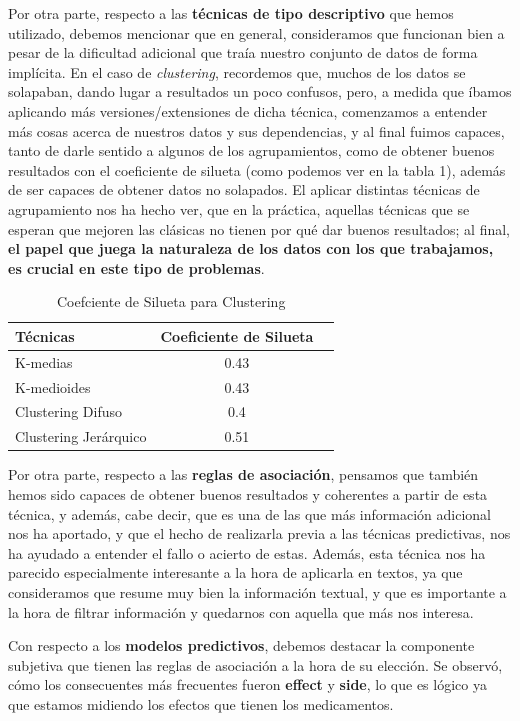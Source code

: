 \documentclass[spanish,]{article}
\begin{document}
Por otra parte, respecto a las \textbf{técnicas de tipo descriptivo} que
hemos utilizado, debemos mencionar que en general, consideramos que
funcionan bien a pesar de la dificultad adicional que traía nuestro
conjunto de datos de forma implícita. En el caso de \emph{clustering},
recordemos que, muchos de los datos se solapaban, dando lugar a
resultados un poco confusos, pero, a medida que íbamos aplicando más
versiones/extensiones de dicha técnica, comenzamos a entender más cosas
acerca de nuestros datos y sus dependencias, y al final fuimos capaces,
tanto de darle sentido a algunos de los agrupamientos, como de obtener
buenos resultados con el coeficiente de silueta (como podemos ver en la
tabla 1), además de ser capaces de obtener datos no solapados. El
aplicar distintas técnicas de agrupamiento nos ha hecho ver, que en la
práctica, aquellas técnicas que se esperan que mejoren las clásicas no
tienen por qué dar buenos resultados; al final, \textbf{el papel que
juega la naturaleza de los datos con los que trabajamos, es crucial en
este tipo de problemas}.

\begin{table}[h]
\centering
  \begin{tabular}{|l|c|c|}
    \hline
    \textbf{Técnicas} & \textbf{Coeficiente de Silueta} \\ \hline
    K-medias & 0.43  \\ \hline
    K-medioides & 0.43  \\ \hline
    Clustering Difuso & 0.4 \\ \hline
    Clustering Jerárquico & 0.51 \\ \hline
  \end{tabular}
  \caption{Coefciente de Silueta para Clustering}
\end{table}

Por otra parte, respecto a las \textbf{reglas de asociación}, pensamos
que también hemos sido capaces de obtener buenos resultados y coherentes
a partir de esta técnica, y además, cabe decir, que es una de las que
más información adicional nos ha aportado, y que el hecho de realizarla
previa a las técnicas predictivas, nos ha ayudado a entender el fallo o
acierto de estas. Además, esta técnica nos ha parecido especialmente
interesante a la hora de aplicarla en textos, ya que consideramos que
resume muy bien la información textual, y que es importante a la hora de
filtrar información y quedarnos con aquella que más nos interesa.

Con respecto a los \textbf{modelos predictivos}, debemos destacar la
componente subjetiva que tienen las reglas de asociación a la hora de su
elección. Se observó, cómo los consecuentes más frecuentes fueron
\textbf{effect} y \textbf{side}, lo que es lógico ya que estamos
midiendo los efectos que tienen los medicamentos.
\end{document}
